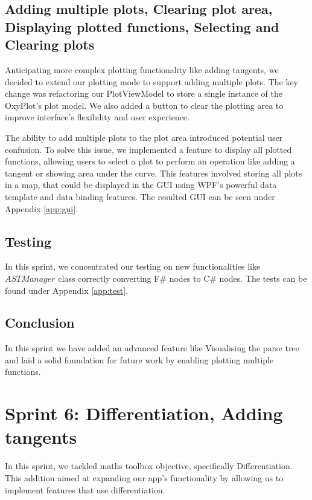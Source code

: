 \documentclass[a4paper, oneside, 11pt]{report}
\begin{document}
\subsection{Adding multiple plots, Clearing plot area, Displaying plotted functions, Selecting and Clearing plots}
Anticipating more complex plotting functionality like adding tangents, we decided to extend our plotting mode to support adding multiple plots. The key change was refactoring our PlotViewModel to store a single instance of the OxyPlot's plot model. We also added a button to clear the plotting area to improve interface's flexibility and user experience. 

The ability to add multiple plots to the plot area introduced potential user confusion. To solve this issue, we implemented a feature to display all plotted functions, allowing users to select a plot to perform an operation like adding a tangent or showing area under the curve. This features involved storing all plots in a map, that could be displayed in the GUI using WPF's powerful data template and data binding features. The resulted GUI can be seen under Appendix \ref{app:gui}.

\subsection{Testing}
In this sprint, we concentrated our testing on new functionalities like $ASTManager$ class correctly converting F\# nodes to C\# nodes. The tests can be found under Appendix \ref{app:test}.

\subsection{Conclusion}
In this sprint we have added an advanced feature like Visualising the parse tree and laid a solid foundation for future work by enabling plotting multiple functions.

\section{Sprint 6: Differentiation, Adding tangents}
In this sprint, we tackled maths toolbox objective, specifically Differentiation. This addition aimed at expanding our app's functionality by allowing us to implement features that use differentiation.
\end{document}
